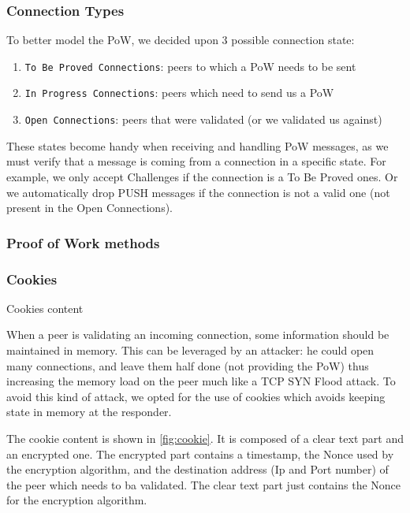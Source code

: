 \documentclass[a4paper,english,10pt,NET]{tumarticle}
\begin{document}
\subsubsection{Connection Types}

To better model the PoW, we decided upon 3 possible connection state:

\begin{enumerate}
	\item \texttt{To Be Proved Connections}: peers to which a PoW needs to be sent
	\item \texttt{In Progress Connections}: peers which need to send us a PoW
	\item \texttt{Open Connections}: peers that were validated (or we validated us against)
\end{enumerate}

These states become handy when receiving and handling PoW messages, as we must verify that a message is coming from a connection in a specific state. For example, we only accept Challenges if the connection is a To Be Proved ones. Or we automatically drop PUSH messages if the connection is not a valid one (not present in the Open Connections).

\subsubsection{Proof of Work methods}


\subsubsection{Cookies}

\begin{table}
	\centering
	
	\caption{Cookies content}
	\label{fig:cookie}
\end{table}

When a peer is validating an incoming connection, some information should be maintained in memory. This can be leveraged by an attacker: he could open many connections, and leave them half done (not providing the PoW) thus increasing the memory load on the peer much like a TCP SYN Flood attack. To avoid this kind of attack, we opted for the use of cookies which avoids keeping state in memory at the responder.

The cookie content is shown in \cref{fig:cookie}. It is composed of a clear text part and an encrypted one. The encrypted part contains a timestamp, the Nonce used by the encryption algorithm, and the destination address (Ip and Port number) of the peer which needs to ba validated. The clear text part just contains the Nonce for the encryption algorithm.
\end{document}
